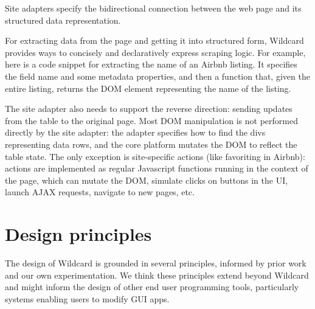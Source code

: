 \documentclass[english,submission]{programming}
\newenvironment{Shaded}{}{}
\newcommand{\FunctionTok}[1]{\textcolor[rgb]{0.02,0.16,0.49}{#1}}
\newcommand{\KeywordTok}[1]{\textcolor[rgb]{0.00,0.44,0.13}{\textbf{#1}}}
\newcommand{\NormalTok}[1]{#1}
\newcommand{\OperatorTok}[1]{\textcolor[rgb]{0.40,0.40,0.40}{#1}}
\newcommand{\SpecialCharTok}[1]{\textcolor[rgb]{0.25,0.44,0.63}{#1}}
\newcommand{\StringTok}[1]{\textcolor[rgb]{0.25,0.44,0.63}{#1}}
\newcommand{\VariableTok}[1]{\textcolor[rgb]{0.10,0.09,0.49}{#1}}
\newcommand{\VerbatimStringTok}[1]{\textcolor[rgb]{0.25,0.44,0.63}{#1}}
\begin{document}
Site adapters specify the bidirectional connection between the web page
and its structured data representation.

For extracting data from the page and getting it into structured form,
Wildcard provides ways to concisely and declaratively express scraping
logic. For example, here is a code snippet for extracting the name of an
Airbnb listing. It specifies the field name and some metadata
properties, and then a function that, given the entire listing, returns
the DOM element representing the name of the listing.

\begin{Shaded}
\end{Shaded}

The site adapter also needs to support the reverse direction: sending
updates from the table to the original page. Most DOM manipulation is
not performed directly by the site adapter: the adapter specifies how to
find the divs representing data rows, and the core platform mutates the
DOM to reflect the table state. The only exception is site-specific
actions (like favoriting in Airbnb): actions are implemented as regular
Javascript functions running in the context of the page, which can
mutate the DOM, simulate clicks on buttons in the UI, launch AJAX
requests, navigate to new pages, etc.

\hypertarget{design-principles}{%
\section{Design principles}\label{design-principles}}

The design of Wildcard is grounded in several principles, informed by
prior work and our own experimentation. We think these principles extend
beyond Wildcard and might inform the design of other end user
programming tools, particularly systems enabling users to modify GUI
apps.
\end{document}
